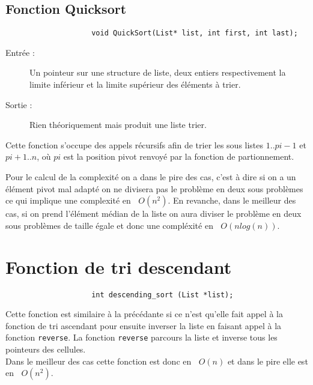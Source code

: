 \documentclass[a4paper, 12pt, leqno]{report}
\theoremstyle{plain}
\newcommand{\bigO}[1]{\ensuremath{\mathop{}\mathopen{}O\mathopen{}\left(#1\right)}}
\begin{document}
            \subsection{Fonction Quicksort}
             \begin{verbatim}
                    void QuickSort(List* list, int first, int last);
                \end{verbatim}
                \begin{description}
                    \item[Entrée :] Un pointeur sur une structure de liste, deux entiers respectivement la limite inférieur et la limite supérieur des éléments à trier.
                    \item[Sortie :] Rien théoriquement mais produit une liste trier.
                \end{description}
                Cette fonction s'occupe des appels récursifs afin de trier les sous listes $1..pi-1$ et $pi+1..n$, où $pi$ est la position pivot renvoyé par la fonction de partionnement.
                
                Pour le calcul de la complexité on a dans le pire des cas, c'est à dire si on a un élément pivot mal adapté on ne divisera pas le problème en deux sous problèmes ce qui implique une complexité en $\bigO{n^2}$. En revanche, dans le meilleur des cas, si on prend l'élément médian de la liste on aura diviser le problème en deux sous problèmes de taille égale et donc une compléxité en $\bigO{nlog(n)}$.
                
                \newpage
                
        \section{Fonction de tri descendant}
         \begin{verbatim}
                    int descending_sort (List *list);
                \end{verbatim}
             
                Cette fonction est similaire à la précédante si ce n'est qu'elle fait appel à la fonction de tri ascendant pour ensuite inverser la liste en faisant appel à la fonction \verb+reverse+. La fonction \verb+reverse+ parcours la liste et inverse tous les pointeurs des cellules.\\
                
                Dans le meilleur des cas cette fonction est donc en $\bigO{n}$ et dans le pire elle est en $\bigO{n^2}$.
                
\end{document}
